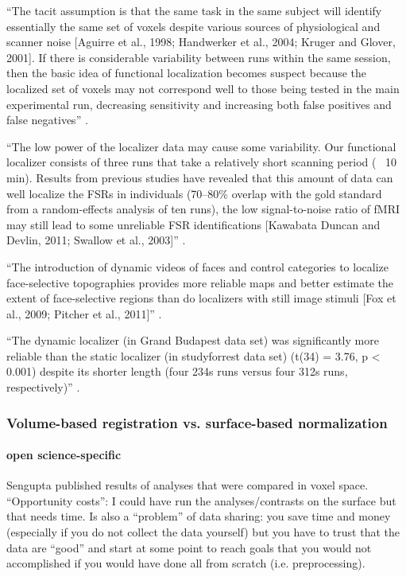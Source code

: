 ``The tacit assumption is that the same task in the same subject will identify
essentially the same set of voxels despite various sources of physiological and
scanner noise [Aguirre et al., 1998; Handwerker et al., 2004; Kruger and Glover,
2001].
%
If there is considerable variability between runs within the same session, then
the basic idea of functional localization becomes suspect because the localized
set of voxels may not correspond well to those being tested in the main
experimental run, decreasing sensitivity and increasing both false positives and
false negatives'' \citep{duncan2009consistency}.

``The low power of the localizer data may cause some variability.
%
Our functional localizer consists of three runs that take a relatively short
scanning period (~ 10 min).
%
Results from previous studies have revealed that this amount of data can well
localize the FSRs in individuals (70–80\% overlap with the gold standard from a
random-effects analysis of ten runs), the low signal-to-noise ratio of fMRI may
still lead to some unreliable FSR identifications [Kawabata Duncan and Devlin,
2011; Swallow et al., 2003]'' \citep{zhen2015quantifying}.


``The introduction of dynamic videos of faces and control categories to localize
face-selective topographies provides more reliable maps and better estimate the
extent of face-selective regions than do localizers with still image stimuli
[Fox et al., 2009; Pitcher et al., 2011]'' \citep{jiahui2020predicting}.

``The dynamic localizer (in Grand Budapest data set) was significantly more
reliable than the static localizer (in studyforrest data set) (t(34) = 3.76, p <
0.001) despite its shorter length (four 234s runs versus four 312s runs,
respectively)'' \citep{jiahui2020predicting}.


\subsubsection{Volume-based registration vs. surface-based normalization}



\paragraph{open science-specific}

Sengupta published results of analyses that were compared in voxel space.
%
``Opportunity costs'': I could have run the analyses/contrasts on the surface
but that needs time.
%
Is also a ``problem'' of data sharing: you save time and money (especially if
you do not collect the data yourself) but you have to trust that the data are
``good'' and start at some point to reach goals that you would not accomplished
if you would have done all from scratch (i.e. preprocessing).


